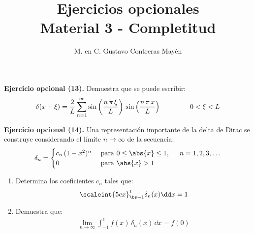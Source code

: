 
\title{Ejercicios opcionales \\[0.3em]  \large{Material 3 - Completitud} \vspace{-3ex}}
\author{M. en C. Gustavo Contreras Mayén}
\date{ }


\vspace{-4cm}
\maketitle
\fontsize{14}{14}\selectfont

\noindent
\textbf{Ejercicio opcional (13). } Demuestra que se puede escribir:
\begin{align*}
\delta (x - \xi) = \dfrac{2}{L} \sum_{n=1}^{\infty} \sin \left( \dfrac{n \, \pi \, \xi}{L} \right) \, \sin \left( \dfrac{n \, \pi \, x}{L} \right) \hspace{1.5cm} 0 < \xi < L 
\end{align*}

\vspace*{1cm}
\noindent
\textbf{Ejercicio opcional (14). } Una representación importante de la delta de Dirac se construye considerando el límite $n \to \infty$ de la secuencia:
\begin{align*}
\delta_{n} = \begin{cases}
c_{n} \, (1 - x^{2})^{n} & \mbox{ para } 0 \leq \abs{x} \leq 1, \hspace{0.5cm} n = 1, 2, 3, \ldots \\
0 & \mbox{ para } \abs{x} > 1
\end{cases}
\end{align*}
\begin{enumerate}[label=\alph*)]
\item Determina los coeficientes $c_{n}$ tales que:
\begin{align*}
\scaleint{5ex}_{\bs -1}^{1} \delta_{n} (x) \dd x = 1
\end{align*}
\item Demuestra que:
\begin{align*}
\lim_{n \to \infty} \int_{-1}^{1} f(x) \, \delta_{n} (x) \, \dd x = f(0)
\end{align*}
\end{enumerate}

